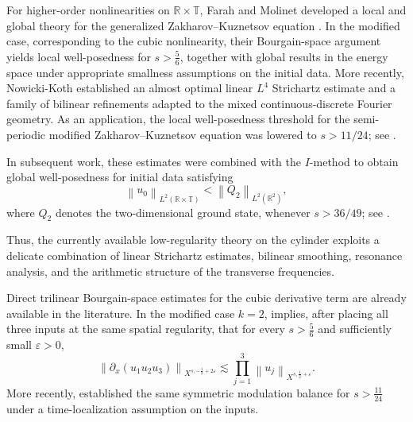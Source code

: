 \documentclass[12pt,oneside,reqno]{amsart}
\numberwithin{equation}{section}
\theoremstyle{plain}
\def\R{{\mathbb R}}
\def\T{{\mathbb T}}
\newcommand{\norm}[1]{%
    \left\lVert #1\right\rVert%
}
\begin{document}
For higher-order nonlinearities on $\R\times\T$, Farah and Molinet developed
a local and global theory for the generalized Zakharov--Kuznetsov equation
\cite{farah2024note}. In the modified case, corresponding to the cubic
nonlinearity, their Bourgain-space argument yields local well-posedness for
$s>\frac56$, together with global results in the energy space under
appropriate smallness assumptions on the initial data. More recently,
Nowicki-Koth established an almost optimal linear $L^4$ Strichartz estimate
and a family of bilinear refinements adapted to the mixed
continuous-discrete Fourier geometry. As an application, the local
well-posedness threshold for the semi-periodic modified
Zakharov--Kuznetsov equation was lowered to $ s>{11}/{24}$; see \cite{nowickikoth2026strichartz}.

In subsequent work, these estimates were combined with the $I$-method to obtain global well-posedness for initial data satisfying
\begin{equation}
    \norm{u_0}_{L^2(\R\times\T)}<\norm{Q_2}_{L^2(\R^2)},
\end{equation}
where $Q_2$ denotes
the two-dimensional ground state, whenever $s>{36}/{49}$; see \cite{nowickikoth2026global}. 

Thus, the currently available
low-regularity theory on the cylinder exploits a delicate combination of
linear Strichartz estimates, bilinear smoothing, resonance analysis, and the
arithmetic structure of the transverse frequencies.

Direct trilinear Bourgain-space estimates for the cubic derivative term are
already available in the literature. In the modified case $k=2$,
\cite[Proposition~3.3]{farah2024note} implies, after placing all three inputs
at the same spatial regularity, that for every $s>\frac56$ and sufficiently
small $\varepsilon>0$,
\begin{equation}
\label{eq:farah-molinet-trilinear-estimate}
    \left\|
        \partial_x(u_1u_2u_3)
    \right\|_{X^{s,-\frac12+2\varepsilon}}
    \lesssim
    \prod_{j=1}^{3}
    \norm{u_j}_{X^{s,\frac12+\varepsilon}}.
\end{equation}
More recently, \cite[Proposition~4.3]{nowickikoth2026strichartz} established
the same symmetric modulation balance for $s>\frac{11}{24}$ under a
time-localization assumption on the inputs.
\end{document}
